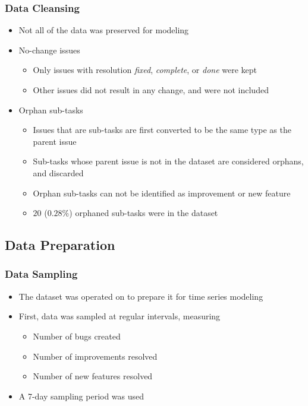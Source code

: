 \documentclass[presentation]{beamer}
\begin{document}
\begin{frame}[t]
\frametitle{Data Cleansing}
\begin{itemize}
\item{Not all of the data was preserved for modeling}
\item{No-change issues
  \begin{itemize}
  \item{Only issues with resolution \textit{fixed}, \textit{complete}, or \textit{done} were kept}
  \item{Other issues did not result in any change, and were not included}  
  \end{itemize}
}
\item{Orphan sub-tasks
  \begin{itemize}
  \item{Issues that are sub-tasks are first converted to be the same type as the parent issue}
  \item{Sub-tasks whose parent issue is not in the dataset are considered orphans, and discarded}
  \item{Orphan sub-tasks can not be identified as improvement or new feature}
  \item{$20$ ($0.28\%$) orphaned sub-tasks were in the dataset}
  \end{itemize}
}
\end{itemize}
\end{frame}

\subsection{Data Preparation}

\begin{frame}[t]
\frametitle{Data Sampling}
\begin{itemize}
\item{The dataset was operated on to prepare it for time series modeling}
\item{First, data was sampled at regular intervals, measuring
  \begin{itemize}
  \item{Number of bugs created}
  \item{Number of improvements resolved}
  \item{Number of new features resolved}
  \end{itemize}
}
\item{A 7-day sampling period was used}
\end{itemize}
\end{frame}
\end{document}
